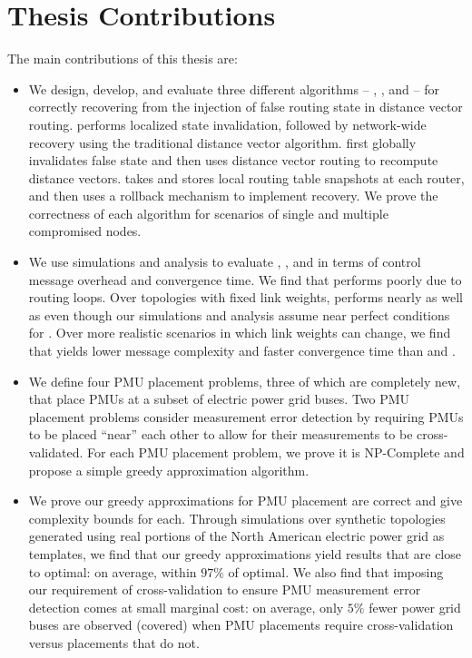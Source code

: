 \section{Thesis Contributions}


The main contributions of this thesis are:
\begin{itemize}

	\item  We design, develop, and evaluate three different algorithms -- \seconds, \purges, and \cpr -- for correctly recovering from the injection of false routing state in distance vector routing.
		\second performs localized state invalidation, followed by network-wide recovery using the traditional distance vector algorithm. 
		\purge first globally invalidates false state and then uses distance vector routing to recompute distance vectors.  \cpr takes and stores local routing table 
		snapshots at each router, and then uses 
		a rollback mechanism to implement recovery. We prove the correctness of each algorithm for scenarios of single and multiple compromised nodes.

	

	\item We use simulations and analysis to evaluate \seconds, \purges, and \cpr in terms of control message overhead and convergence time. We find that \second performs poorly due to routing loops.  
	Over topologies with fixed link weights, \purge performs nearly as well as \cpr even though our simulations and analysis assume near perfect conditions for \cprs.
	Over more realistic scenarios in which link weights can change, we find that \purge yields lower message complexity and faster convergence time than \cpr and \seconds. 


	\item We define four PMU placement problems, three of which are completely new, that place PMUs at a subset of electric power grid buses. 
		Two PMU placement problems consider measurement error detection by requiring PMUs to be placed ``near'' each other to allow for their measurements to be cross-validated. 
		For each PMU placement problem, we prove it is NP-Complete and propose a simple greedy approximation algorithm. 

	
	\item We prove our greedy approximations for PMU placement are correct and give complexity bounds for each.  Through simulations over synthetic topologies generated using real portions of the 
		North American electric power grid as templates, we find that our greedy approximations yield results that are close to optimal: on average, within $97\%$ of optimal.  We also find that 
		imposing our requirement of cross-validation to ensure PMU measurement error detection comes at small marginal cost: on average, only $5\%$ fewer power grid buses are observed (covered) 
		when PMU placements require cross-validation versus placements that do not. 
	


\end{itemize}
